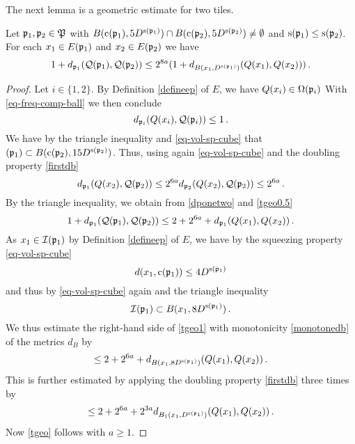 The next lemma is a geometric estimate for two tiles.
\begin{lemma}\label{tile-uncertainty}
\leanok
{}
    Let ${\mathfrak p}_1, {\mathfrak p}_2\in {\mathfrak P}$ with
    $B({\mathrm{c}}({\mathfrak p}_1),5D^{{\mathrm{s}}({\mathfrak p}_1)}) \cap B({\mathrm{c}}({\mathfrak p}_2),5D^{{\mathrm{s}}({\mathfrak p}_2)}) \ne \emptyset$ and
${\mathrm{s}}({{\mathfrak p}_1})\leq {\mathrm{s}}({{\mathfrak p}_2})$. For each $x_1\in E({\mathfrak p}_1)$ and
$x_2\in E({\mathfrak p}_2)$ we have
\begin{equation}\label{tgeo}
  1+d_{{\mathfrak p}_1}({\mathcal{Q}}({\mathfrak p}_1), {\mathcal{Q}}({\mathfrak p}_2))\le
    2^{8a}(1 + d_{B(x_1, D^{{\mathrm{s}}({\mathfrak p}_1)})}({Q}(x_1),{Q}(x_2)))\, .
\end{equation}
\end{lemma}
\begin{proof}
Let $i\in \{1,2\}$.
By Definition \eqref{defineep} of $E$,
we have ${Q}(x_i)\in {\Omega}({\mathfrak p}_i)$
With \eqref{eq-freq-comp-ball} we then conclude
\begin{equation}\label{dponetwo}
    d_{{\mathfrak p}_i}({Q}(x_i),{\mathcal{Q}}({\mathfrak p}_i))\le 1\, .
\end{equation}
We have by the triangle inequality and \eqref{eq-vol-sp-cube} that $\sc({\mathfrak p}_1) \subset B({\mathrm{c}}({\mathfrak p}_2),15D^{{\mathrm{s}}({\mathfrak p}_2)})$.
Thus, using again \eqref{eq-vol-sp-cube} and the doubling property \eqref{firstdb}
\begin{equation}\label{tgeo0.5}
    d_{{\mathfrak p}_1}({Q}(x_2), {\mathcal{Q}}({\mathfrak p}_2)) \le 2^{6a} d_{{\mathfrak p}_2}({Q}(x_2), {\mathcal{Q}}({\mathfrak p}_2)) \le 2^{6a}\,.
\end{equation}
By the triangle inequality, we obtain from \eqref{dponetwo} and
\eqref{tgeo0.5}
\begin{equation}\label{tgeo1}
     1+d_{{\mathfrak p}_1}({\mathcal{Q}}({\mathfrak p}_1), {\mathcal{Q}}({\mathfrak p}_2))\le 2 + 2^{6a} +d_{{\mathfrak p}_1}({Q}(x_1), {Q}(x_2))\, .
\end{equation}
As $x_1\in {\mathcal{I}}({\mathfrak p}_1)$ by Definition \eqref{defineep} of $E$, we have by the squeezing property \eqref{eq-vol-sp-cube}
\begin{equation}
    d(x_1,{\mathrm{c}}({\mathfrak p}_1))\le 4D^{{\mathrm{s}}({\mathfrak p}_1)}
\end{equation}
and thus by \eqref{eq-vol-sp-cube} again and the triangle inequality
\begin{equation}
    {\mathcal{I}}({\mathfrak p}_1)\subset B(x_1,8D^{{\mathrm{s}}({\mathfrak p}_1)})\, .
\end{equation}
We thus estimate the right-hand side of \eqref{tgeo1} with monotonicity \eqref{monotonedb} of the metrics $d_B$ by
\begin{equation}\label{tgeo1.5}
    \le 2 + 2^{6a} + d_{B(x_1,8D^{{\mathrm{s}}({\mathfrak p}_1)})}({Q}(x_1), {Q}(x_2))\, .
\end{equation}
This is further estimated by applying the doubling property \eqref{firstdb} three times by
\begin{equation}\label{tgeo2}
    \le 2 + 2^{6a} +2^{3a}d_{B_1(x_1, D^{{\mathrm{s}}({\mathfrak p}_1)})}({Q}(x_1), {Q}(x_2))\, .
\end{equation}
Now \eqref{tgeo} follows with $a\ge 1$.
\end{proof}


